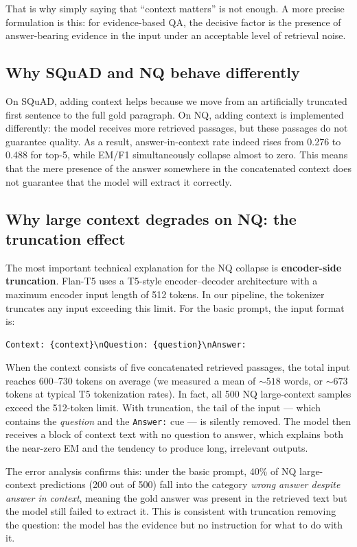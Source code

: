 \documentclass[a4paper,12pt]{article}
\begin{document}
That is why simply saying that “context matters” is not enough. A more precise formulation is this: for evidence-based QA, the decisive factor is the presence of answer-bearing evidence in the input under an acceptable level of retrieval noise.

\subsection{Why SQuAD and NQ behave differently}
On SQuAD, adding context helps because we move from an artificially truncated first sentence to the full gold paragraph. On NQ, adding context is implemented differently: the model receives more retrieved passages, but these passages do not guarantee quality. As a result, answer-in-context rate indeed rises from 0.276 to 0.488 for top-5, while EM/F1 simultaneously collapse almost to zero. This means that the mere presence of the answer somewhere in the concatenated context does not guarantee that the model will extract it correctly.

\subsection{Why large context degrades on NQ: the truncation effect}
The most important technical explanation for the NQ collapse is \textbf{encoder-side truncation}. Flan-T5 uses a T5-style encoder--decoder architecture with a maximum encoder input length of 512 tokens. In our pipeline, the tokenizer truncates any input exceeding this limit. For the basic prompt, the input format is:
\begin{verbatim}
Context: {context}\nQuestion: {question}\nAnswer:
\end{verbatim}
When the context consists of five concatenated retrieved passages, the total input reaches 600--730 tokens on average (we measured a mean of ${\sim}518$ words, or ${\sim}673$ tokens at typical T5 tokenization rates). In fact, all 500 NQ large-context samples exceed the 512-token limit. With truncation, the tail of the input — which contains the \textit{question} and the \texttt{Answer:} cue — is silently removed. The model then receives a block of context text with no question to answer, which explains both the near-zero EM and the tendency to produce long, irrelevant outputs.

The error analysis confirms this: under the basic prompt, 40\% of NQ large-context predictions (200 out of 500) fall into the category \textit{wrong answer despite answer in context}, meaning the gold answer was present in the retrieved text but the model still failed to extract it. This is consistent with truncation removing the question: the model has the evidence but no instruction for what to do with it.
\end{document}
